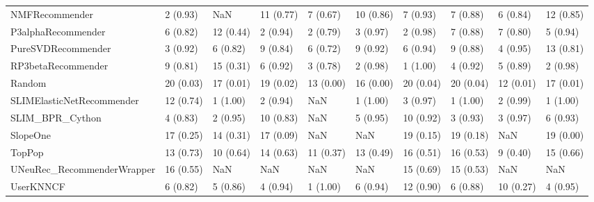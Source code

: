 \begin{tabular}{llllllllll}
                     NMFRecommender &                 2 (0.93) &         NaN &     11 (0.77) &     7 (0.67) &            10 (0.86) &            7 (0.93) &          7 (0.88) &           6 (0.84) &         12 (0.85) \\
                 P3alphaRecommender &                 6 (0.82) &   12 (0.44) &      2 (0.94) &     2 (0.79) &             3 (0.97) &            2 (0.98) &          7 (0.88) &           7 (0.80) &          5 (0.94) \\
                 PureSVDRecommender &                 3 (0.92) &    6 (0.82) &      9 (0.84) &     6 (0.72) &             9 (0.92) &            6 (0.94) &          9 (0.88) &           4 (0.95) &         13 (0.81) \\
                 RP3betaRecommender &                 9 (0.81) &   15 (0.31) &      6 (0.92) &     3 (0.78) &             2 (0.98) &            1 (1.00) &          4 (0.92) &           5 (0.89) &          2 (0.98) \\
                             Random &                20 (0.03) &   17 (0.01) &     19 (0.02) &    13 (0.00) &            16 (0.00) &           20 (0.04) &         20 (0.04) &          12 (0.01) &         17 (0.01) \\
          SLIMElasticNetRecommender &                12 (0.74) &    1 (1.00) &      2 (0.94) &          NaN &             1 (1.00) &            3 (0.97) &          1 (1.00) &           2 (0.99) &          1 (1.00) \\
                    SLIM\_BPR\_Cython &                 4 (0.83) &    2 (0.95) &     10 (0.83) &          NaN &             5 (0.95) &           10 (0.92) &          3 (0.93) &           3 (0.97) &          6 (0.93) \\
                           SlopeOne &                17 (0.25) &   14 (0.31) &     17 (0.09) &          NaN &                  NaN &           19 (0.15) &         19 (0.18) &                NaN &         19 (0.00) \\
                             TopPop &                13 (0.73) &   10 (0.64) &     14 (0.63) &    11 (0.37) &            13 (0.49) &           16 (0.51) &         16 (0.53) &           9 (0.40) &         15 (0.66) \\
         UNeuRec\_RecommenderWrapper &                16 (0.55) &         NaN &           NaN &          NaN &                  NaN &           15 (0.69) &         15 (0.53) &                NaN &               NaN \\
                          UserKNNCF &                 6 (0.82) &    5 (0.86) &      4 (0.94) &     1 (1.00) &             6 (0.94) &           12 (0.90) &          6 (0.88) &          10 (0.27) &          4 (0.95) \\
\bottomrule
\end{tabular}
